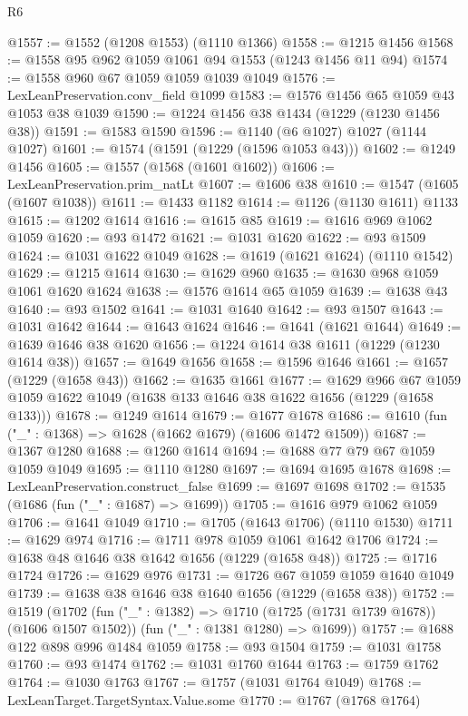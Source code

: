 \begin{lexlean}{R6}
\begin{coremodule}
@1557 := @1552 (@1208 @1553) (@1110 @1366)
@1558 := @1215 @1456
@1568 := @1558 @95 @962 @1059 @1061 @94 @1553 (@1243 @1456 @11 @94)
@1574 := @1558 @960 @67 @1059 @1059 @1039 @1049
@1576 := LexLeanPreservation.conv_field @1099
@1583 := @1576 @1456 @65 @1059 @43 @1053 @38 @1039
@1590 := @1224 @1456 @38 @1434 (@1229 (@1230 @1456 @38))
@1591 := @1583 @1590
@1596 := @1140 (@6 @1027) @1027 (@1144 @1027)
@1601 := @1574 (@1591 (@1229 (@1596 @1053 @43)))
@1602 := @1249 @1456
@1605 := @1557 (@1568 (@1601 @1602))
@1606 := LexLeanPreservation.prim_natLt
@1607 := @1606 @38
@1610 := @1547 (@1605 (@1607 @1038))
@1611 := @1433 @1182
@1614 := @1126 (@1130 @1611) @1133
@1615 := @1202 @1614
@1616 := @1615 @85
@1619 := @1616 @969 @1062 @1059
@1620 := @93 @1472
@1621 := @1031 @1620
@1622 := @93 @1509
@1624 := @1031 @1622 @1049
@1628 := @1619 (@1621 @1624) (@1110 @1542)
@1629 := @1215 @1614
@1630 := @1629 @960
@1635 := @1630 @968 @1059 @1061 @1620 @1624
@1638 := @1576 @1614 @65 @1059
@1639 := @1638 @43
@1640 := @93 @1502
@1641 := @1031 @1640
@1642 := @93 @1507
@1643 := @1031 @1642
@1644 := @1643 @1624
@1646 := @1641 (@1621 @1644)
@1649 := @1639 @1646 @38 @1620
@1656 := @1224 @1614 @38 @1611 (@1229 (@1230 @1614 @38))
@1657 := @1649 @1656
@1658 := @1596 @1646
@1661 := @1657 (@1229 (@1658 @43))
@1662 := @1635 @1661
@1677 := @1629
    @966
    @67
    @1059
    @1059
    @1622
    @1049
    (@1638 @133 @1646 @38 @1622 @1656 (@1229 (@1658 @133)))
@1678 := @1249 @1614
@1679 := @1677 @1678
@1686 := @1610 (fun ("_" : @1368) => @1628 (@1662 @1679) (@1606 @1472 @1509))
@1687 := @1367 @1280
@1688 := @1260 @1614
@1694 := @1688 @77 @79 @67 @1059 @1059 @1049
@1695 := @1110 @1280
@1697 := @1694 @1695 @1678
@1698 := LexLeanPreservation.construct_false
@1699 := @1697 @1698
@1702 := @1535 (@1686 (fun ("_" : @1687) => @1699))
@1705 := @1616 @979 @1062 @1059
@1706 := @1641 @1049
@1710 := @1705 (@1643 @1706) (@1110 @1530)
@1711 := @1629 @974
@1716 := @1711 @978 @1059 @1061 @1642 @1706
@1724 := @1638 @48 @1646 @38 @1642 @1656 (@1229 (@1658 @48))
@1725 := @1716 @1724
@1726 := @1629 @976
@1731 := @1726 @67 @1059 @1059 @1640 @1049
@1739 := @1638 @38 @1646 @38 @1640 @1656 (@1229 (@1658 @38))
@1752 := @1519
    (@1702
      (fun ("_" : @1382) => @1710 (@1725 (@1731 @1739 @1678)) (@1606 @1507 @1502))
      (fun ("_" : @1381 @1280) => @1699))
@1757 := @1688 @122 @898 @996 @1484 @1059
@1758 := @93 @1504
@1759 := @1031 @1758
@1760 := @93 @1474
@1762 := @1031 @1760 @1644
@1763 := @1759 @1762
@1764 := @1030 @1763
@1767 := @1757 (@1031 @1764 @1049)
@1768 := LexLeanTarget.TargetSyntax.Value.some
@1770 := @1767 (@1768 @1764)

\end{coremodule}
\end{lexlean}
